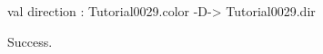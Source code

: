 \runverbatimtrue
{}
\begin{RunVerbatimMsg}
val direction : Tutorial0029.color -D-> Tutorial0029.dir
\end{RunVerbatimMsg}
\begin{RunVerbatimErr}
Success.
\end{RunVerbatimErr}
